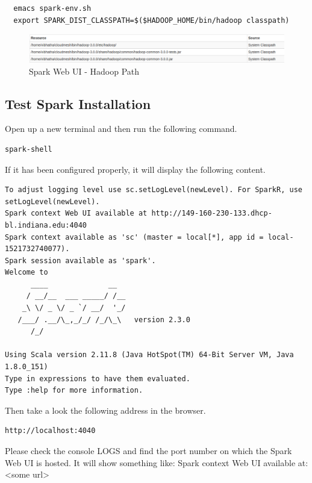\begin{lstlisting}
  emacs spark-env.sh
  export SPARK_DIST_CLASSPATH=$($HADOOP_HOME/bin/hadoop classpath)
\end{lstlisting}

\begin{figure}
\centering
\includegraphics[width=\textwidth,height=\textheight,keepaspectratio]{images/spark-hadoop.png}
\caption{Spark Web UI - Hadoop Path}
\end{figure}


\subsection{Test Spark Installation}

Open up a new terminal and then run the following command.

\begin{lstlisting}
spark-shell
\end{lstlisting}

If it has been configured properly, it will display the following content.

\begin{lstlisting}
To adjust logging level use sc.setLogLevel(newLevel). For SparkR, use setLogLevel(newLevel).
Spark context Web UI available at http://149-160-230-133.dhcp-bl.indiana.edu:4040
Spark context available as 'sc' (master = local[*], app id = local-1521732740077).
Spark session available as 'spark'.
Welcome to
      ____              __
     / __/__  ___ _____/ /__
    _\ \/ _ \/ _ `/ __/  '_/
   /___/ .__/\_,_/_/ /_/\_\   version 2.3.0
      /_/
         
Using Scala version 2.11.8 (Java HotSpot(TM) 64-Bit Server VM, Java 1.8.0_151)
Type in expressions to have them evaluated.
Type :help for more information.
\end{lstlisting}

Then take a look the following address in the browser.
\begin{lstlisting}
http://localhost:4040
\end{lstlisting}

\begin{NOTE}
  Please check the console LOGS and find the port number on which the
  Spark Web UI is hosted. It will show something like:
  Spark context Web UI available at: <some url>
\end{NOTE}

